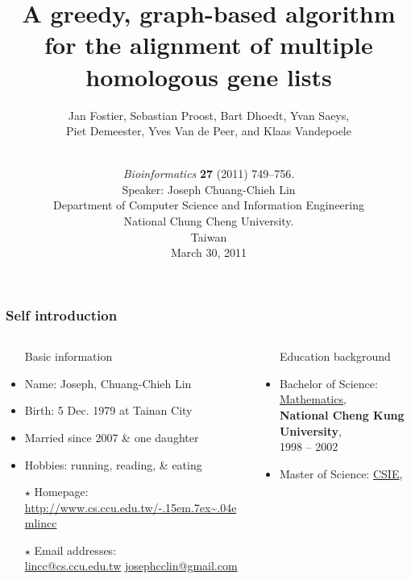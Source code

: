 \documentclass[xcolor=dvipsnames,envcountsect,handout]{beamer}
\title[Greedy graph-based gene-lists alignment]
{A greedy, graph-based algorithm for the alignment of multiple homologous 
gene lists}
\author[Joseph C.-C. Lin]{Jan Fostier, Sebastian Proost, Bart Dhoedt, 
Yvan Saeys,\\ Piet Demeester, Yves Van de Peer, and Klaas Vandepoele}
\institute[CSIE, CCU, Taiwan]{}
\date[30 March 2011]{\vspace{-28pt}\\
{{\footnotesize {\em Bioinformatics} {\bf 27}
(2011) 749--756.}\vspace{10pt}\\
Speaker: Joseph Chuang-Chieh Lin\vspace{10pt}\\
{\small Department of Computer Science and Information 
Engineering\\
National Chung Cheng University.\\
Taiwan
\vspace{8pt}\\
March 30, 2011}}}
\def\urltilde{\kern -.15em\lower .7ex\hbox{\~{}}\kern .04em}
\begin{document}
\maketitle
\beamertemplatetransparentcovereddynamic


\begin{frame}
\frametitle{Self introduction}
\vspace{-24pt}
\begin{columns}
\begin{column}[t]{6cm}
\begin{itemize}
\item [] Basic information
\end{itemize}
\vspace{-2pt}
\begin{footnotesize}
\begin{itemize}
\item Name: Joseph, Chuang-Chieh Lin
\item Birth: 5 Dec. 1979 at Tainan City
\item Married since 2007 \& one daughter
\item Hobbies: running, reading, \& eating
\vspace{6pt}
\item [$\star$] Homepage: \href{http://www.cs.ccu.edu.tw/~lincc}
{\textcolor{OliveGreen}{http://www.cs.ccu.edu.tw/\urltilde lincc}}
\item [$\star$] Email addresses:\\ 
\href{mailto:lincc@cs.ccu.edu.tw}
{\textcolor{OliveGreen}{lincc@cs.ccu.edu.tw}}
\href{mailto:josephcclin@gmail.com}
{\textcolor{OliveGreen}{josephcclin@gmail.com}}
\end{itemize}
\end{footnotesize}
\end{column}
\hspace{-28pt}
\begin{column}[t]{6cm}
\begin{itemize}
\item [] Education background
\end{itemize}
\vspace{-2pt}
\begin{footnotesize}
\begin{itemize}
\item Bachelor of Science: \underline{Mathematics},\\
{\bf National Cheng Kung University}, \\
1998 -- 2002
\item Master of Science: \underline{CSIE},\\

\end{itemize}
\end{footnotesize}
\end{column}
\end{columns}
\end{frame}
\end{document}
